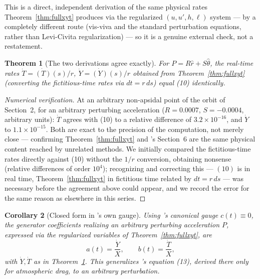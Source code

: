 \documentclass[12pt]{amsart}
\theoremstyle{plain}
\newtheorem{theorem}{Theorem}[section]
\newtheorem{corollary}[theorem]{Corollary}
\theoremstyle{remark}
\begin{document}
This is a direct, independent derivation of the same physical rates Theorem~\ref{thm:fullxyt} produces via the regularized $(u,u',h,\ell)$ system --- by a completely different route (vis-viva and the standard perturbation equations, rather than Levi-Civita regularization) --- so it is a genuine external check, not a restatement.

\begin{theorem}[The two derivations agree exactly]\label{thm:agree}
For $P=R\hat r+S\hat\theta$, the real-time rates $\dot T=\dot{(T)}(s)/r$, $\dot Y=\dot{(Y)}(s)/r$ obtained from Theorem~\ref{thm:fullxyt} (converting the fictitious-time rates via $dt=r\,ds$) equal (10) identically.
\end{theorem}

\begin{proof}[Numerical verification]
At an arbitrary non-apsidal point of the orbit of Section~2, for an arbitrary perturbing acceleration ($R=0.0007$, $S=-0.0004$, arbitrary units): $\dot T$ agrees with (10) to a relative difference of $3.2\times10^{-16}$, and $\dot Y$ to $1.1\times10^{-15}$. Both are exact to the precision of the computation, not merely close --- confirming Theorem~\ref{thm:fullxyt} and \cite{Ebert2026Cone}'s Section~6 are the same physical content reached by unrelated methods. We initially compared the fictitious-time rates directly against (10) without the $1/r$ conversion, obtaining nonsense (relative differences of order $10^4$); recognizing and correcting this --- $(10)$ is in real time, Theorem~\ref{thm:fullxyt} in fictitious time related by $dt=r\,ds$ --- was necessary before the agreement above could appear, and we record the error for the same reason as elsewhere in this series.
\end{proof}

\begin{corollary}[Closed form in \cite{Ebert2026Cone}'s own gauge]\label{cor:gauge}
Using \cite{Ebert2026Cone}'s canonical gauge $c(t)\equiv0$, the generator coefficients realizing an arbitrary perturbing acceleration $P$, expressed via the regularized variables of Theorem~\ref{thm:fullxyt}, are
\begin{equation}
a(t) = \frac{\dot Y}{X}, \qquad b(t)=\frac{\dot T}{X}, \tag{11}
\end{equation}
with $\dot Y,\dot T$ as in Theorem~\ref{thm:agree}. This generalizes \cite{Ebert2026Cone}'s equation (13), derived there only for atmospheric drag, to an arbitrary perturbation.
\end{corollary}
\end{document}
